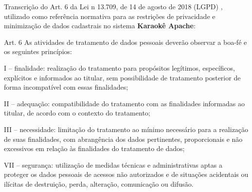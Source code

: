 \begin{anexosenv}


Transcrição do Art. 6{\textordmasculine} da Lei n{\textordmasculine} 13.709, de 14 de agosto de 2018 (LGPD) \cite{brasil2018lgpd}, utilizado como referência normativa para as restrições de privacidade e minimização de dados cadastrais no sistema \textbf{Karaokê Apache}:

\begin{citacao}
Art. 6{\textordmasculine} As atividades de tratamento de dados pessoais deverão observar a boa-fé e os seguintes princípios:

I -- finalidade: realização do tratamento para propósitos legítimos, específicos, explícitos e informados ao titular, sem possibilidade de tratamento posterior de forma incompatível com essas finalidades;

II -- adequação: compatibilidade do tratamento com as finalidades informadas ao titular, de acordo com o contexto do tratamento;

III -- necessidade: limitação do tratamento ao mínimo necessário para a realização de suas finalidades, com abrangência dos dados pertinentes, proporcionais e não excessivos em relação às finalidades do tratamento de dados;

VII -- segurança: utilização de medidas técnicas e administrativas aptas a proteger os dados pessoais de acessos não autorizados e de situações acidentais ou ilícitas de destruição, perda, alteração, comunicação ou difusão.
\end{citacao}

\end{anexosenv}
